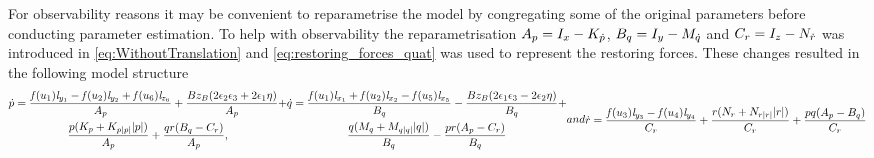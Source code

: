 For observability reasons it may be convenient to reparametrise the model by congregating some of the original parameters before conducting parameter estimation. To help with observability the reparametrisation $A_p = I_{x} - K_{\dot{p}}$, $B_q = I_{y} - M_{\dot{q}}$ and $C_r = I_{z} - N_{\dot{r}}$ was introduced in \eqref{eq:WithoutTranslation} and \eqref{eq:restoring_forces_quat} was used to represent the restoring forces. These changes resulted in the following model structure
\begin{subequations}
\begin{multline}
\pdot = \frac{\thrusterfun{1} \distance{y}{1} - \thrusterfun{2} \distance{y}{2} + \thrusterfun{6} \distance{z}{6}}{A_p} + \frac{B z_B (2 \quatII \quatIII + 2 \quatI \quatO)}{A_p} + \\ \frac{p (\Kp + \Kpabsp \abs{p})}{A_p} + \frac{q r (B_q - C_r)}{A_p},
\end{multline}
\begin{multline}
\qdot = \frac{\thrusterfun{1} \distance{x}{1} + \thrusterfun{2} \distance{x}{2} - \thrusterfun{5} \distance{x}{5}}{B_q} - \frac{B z_B (2 \quatI \quatIII - 2 \quatII \quatO)}{B_q} + \\ \frac{q (\Mq + \Mqabsq \abs{q})}{B_q} - \frac{p r (A_p - C_r)}{B_q}
\end{multline}
and
\begin{multline}
\rdot = \frac{\thrusterfun{3} \distance{y}{3} - \thrusterfun{4} \distance{y}{4}}{C_r} + \frac{r (\Nr + \Nrabsr \abs{r})}{C_r} + \frac{p q (A_p  - B_q)}{C_r}
\end{multline}
\end{subequations}


